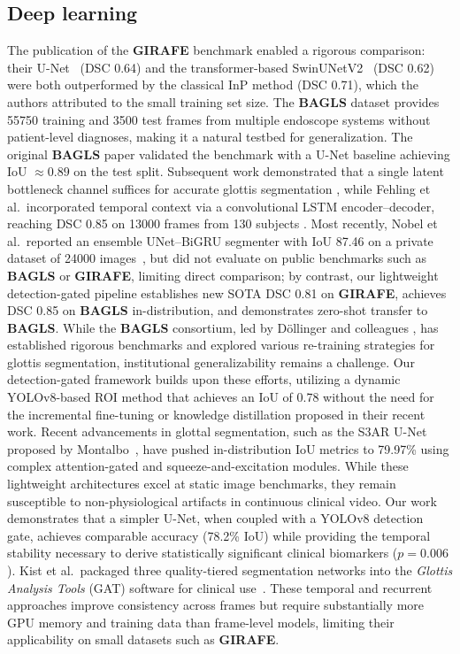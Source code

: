 \documentclass[preprint,12pt]{elsarticle}
\newcommand{\girafe}{\textbf{GIRAFE}}
\newcommand{\bagls}{\textbf{BAGLS}}
\begin{document}
\subsection{Deep learning}
The publication of the \girafe{} benchmark
\cite{andrade2025datainbrief} enabled a rigorous comparison: their
U-Net~\cite{ronneberger2015unet} (DSC \num{0.64}) and the transformer-based
SwinUNetV2~\cite{cao2022swinunet} (DSC \num{0.62}) were both outperformed
by the classical InP
method (DSC \num{0.71}), which the authors attributed to the small training
set size.
The \bagls{} dataset \cite{gomez2020bagls} provides \num{55750} training
and \num{3500} test frames from multiple endoscope systems without
patient-level diagnoses, making it a natural testbed for generalization.
The original \bagls{} paper validated the benchmark with a U-Net baseline
achieving IoU $\approx 0.89$ on the test split.
Subsequent work demonstrated that a single latent bottleneck channel suffices
for accurate glottis segmentation \cite{kist2022latent}, while
Fehling et al.\ incorporated temporal context via a convolutional LSTM
encoder--decoder, reaching DSC \num{0.85} on \num{13000} frames from
\num{130} subjects \cite{fehling2020convlstm}.
Most recently, Nobel et al.\ reported an ensemble UNet--BiGRU segmenter with IoU \num{87.46}
on a private dataset of \num{24000} images~\cite{nobel2024ensemble}, but did not evaluate
on public benchmarks such as \bagls{} or \girafe{}, limiting direct comparison;
by contrast, our lightweight detection-gated pipeline establishes new
SOTA DSC \num{0.81} on \girafe{}, achieves DSC \num{0.85} on \bagls{} in-distribution,
and demonstrates zero-shot transfer to \bagls{}.
While the \bagls{} consortium, led by D\"{o}llinger and colleagues
\cite{dollinger2022}, has established rigorous benchmarks and explored
various re-training strategies for glottis segmentation, institutional
generalizability remains a challenge.
Our detection-gated framework builds upon these efforts, utilizing a
dynamic YOLOv8-based ROI method that achieves an IoU of \num{0.78}
without the need for the incremental fine-tuning or knowledge distillation
proposed in their recent work.
Recent advancements in glottal segmentation, such as the S3AR U-Net
proposed by Montalbo~\cite{montalbo2024}, have pushed in-distribution IoU
metrics to \num{79.97}\% using complex attention-gated and squeeze-and-excitation
modules.
While these lightweight architectures excel at static image benchmarks,
they remain susceptible to non-physiological artifacts in continuous
clinical video.
Our work demonstrates that a simpler U-Net, when coupled with a YOLOv8
detection gate, achieves comparable accuracy (\num{78.2}\% IoU) while
providing the temporal stability necessary to derive statistically
significant clinical biomarkers ($p{=}0.006$).
Kist et al.\ packaged three quality-tiered segmentation networks into the
\emph{Glottis Analysis Tools} (GAT) software for clinical
use~\cite{kist2021gat}.
These temporal and recurrent approaches improve consistency across frames but
require substantially more GPU memory and training data than frame-level
models, limiting their applicability on small datasets such as \girafe{}.
\end{document}
